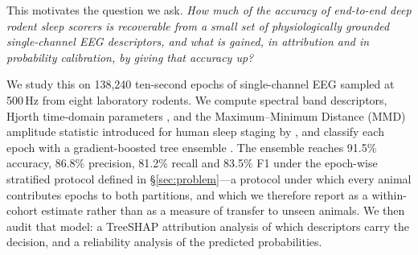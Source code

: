 This motivates the question we ask. \emph{How much of the accuracy of end-to-end deep rodent sleep scorers is recoverable from a small set of physiologically grounded single-channel EEG descriptors, and what is gained, in attribution and in probability calibration, by giving that accuracy up?}

We study this on 138{,}240 ten-second epochs of single-channel EEG sampled at 500\,Hz from eight laboratory rodents. We compute spectral band descriptors, Hjorth time-domain parameters \citep{hjorth1970}, and the Maximum--Minimum Distance (MMD) amplitude statistic introduced for human sleep staging by \citet{e18090272}, and classify each epoch with a gradient-boosted tree ensemble \citep{Chen_2016}. The ensemble reaches 91.5\% accuracy, 86.8\% precision, 81.2\% recall and 83.5\% F1 under the epoch-wise stratified protocol defined in \S\ref{sec:problem}---a protocol under which every animal contributes epochs to both partitions, and which we therefore report as a within-cohort estimate rather than as a measure of transfer to unseen animals. We then audit that model: a TreeSHAP attribution analysis \citep{lundberg2017_shap} of which descriptors carry the decision, and a reliability analysis of the predicted probabilities.


